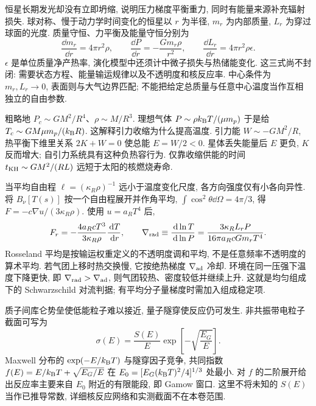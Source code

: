 \label{ch:stellar}
恒星长期发光却没有立即坍缩, 说明压力梯度平衡重力, 同时有能量来源补充辐射损失. 球对称、慢于动力学时间变化的恒星以 $r$ 为半径, $m_r$ 为内部质量, $L_r$ 为穿过球面的光度. 质量守恒、力平衡及能量守恒分别为
\begin{equation}\label{eq:stellar}
\frac{\dd m_r}{\dd r}=4\pi r^2\rho,\qquad
\frac{\dd P}{\dd r}=-\frac{Gm_r\rho}{r^2},\qquad
\frac{\dd L_r}{\dd r}=4\pi r^2\rho\epsilon.
\end{equation}
$\epsilon$ 是单位质量净产热率, 演化模型中还须计中微子损失与热储能变化. 这三式尚不封闭: 需要状态方程、能量输运规律以及不透明度和核反应率. 中心条件为 $m_r,L_r\to0$, 表面则与大气边界匹配; 不能把给定总质量与任意中心温度当作互相独立的自由参数.

粗略地 $P_c\sim GM^2/R^4$、$\rho\sim M/R^3$. 理想气体 $P\sim\rho k_{\mathrm B} T/(\mu m_p)$ 于是给 $T_c\sim GM\mu m_p/(k_{\mathrm B} R)$. 这解释引力收缩为什么提高温度. 引力能 $W\sim-GM^2/R$, 热平衡下维里关系 $2K+W=0$ 使总能 $E=W/2<0$. 星体丢失能量后 $E$ 更负, $K$ 反而增大; 自引力系统具有这种负热容行为. 仅靠收缩供能的时间 $t_{\rm KH}\sim GM^2/(RL)$ 远短于太阳的核燃烧寿命.

当平均自由程 $\ell=(\kappa_R\rho)^{-1}$ 远小于温度变化尺度, 各方向强度仅有小各向异性. 将 $B_\nu[T(s)]$ 按一个自由程展开并作角平均, $\int\cos^2\theta\dd\Omega=4\pi/3$, 得 $F=-c\nabla u/(3\kappa_R\rho)$. 使用 $u=a_RT^4$ 后,
\begin{equation}
F_r=-\frac{4a_RcT^3}{3\kappa_R\rho}\frac{\,\mathrm d T}{\,\mathrm d r},\qquad
\nabla_{\rm rad}\equiv\frac{\,\mathrm d\ln T}{\,\mathrm d\ln P}
=\frac{3\kappa_RL_rP}{16\pi a_RcGm_rT^4}.
\end{equation}
Rosseland 平均是按输运权重定义的不透明度调和平均, 不是任意频率不透明度的算术平均. 若气团上移时热交换慢, 它按绝热梯度 $\nabla_{\rm ad}$ 冷却. 环境在同一压强下温度下降更快, 即 $\nabla_{\rm rad}>\nabla_{\rm ad}$, 则气团较热、密度较低并继续上升. 这就是均匀组成下的 Schwarzschild 对流判据; 有平均分子量梯度时需加入组成稳定项.

质子间库仑势垒使低能粒子难以接近, 量子隧穿使反应仍可发生. 非共振带电粒子截面可写为\[\sigma(E)=\frac{S(E)}E\exp\left[-\sqrt{\frac{E_G}E}\right].\] Maxwell 分布的 $\exp(-E/k_{\mathrm B} T)$ 与隧穿因子竞争, 共同指数 $f(E)=E/k_{\mathrm B} T+\sqrt{E_G/E}$ 在
$E_0=[E_G(k_{\mathrm B} T)^2/4]^{1/3}$ 处最小. 对 $f$ 的二阶展开给出反应率主要来自 $E_0$ 附近的有限能段, 即 Gamow 窗口. 这里不将未知的 $S(E)$ 当作已推导常数, 详细核反应网络和实测截面不在本卷范围.

